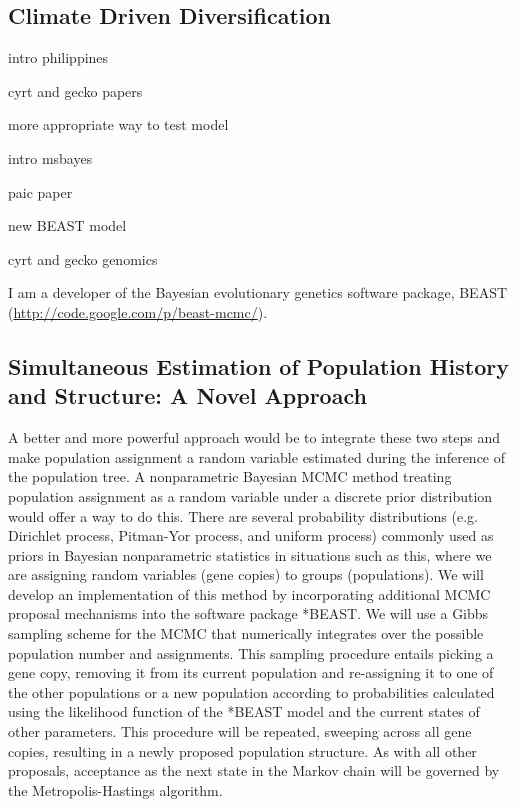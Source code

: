 \documentclass[10pt]{article}
\begin{document}
\subsection*{Climate Driven Diversification}
intro philippines

cyrt and gecko papers

more appropriate way to test model

intro msbayes

paic paper

new BEAST model

cyrt and gecko genomics

I am a developer of the Bayesian evolutionary genetics software package, BEAST (\url{http://code.google.com/p/beast-mcmc/}).

\subsection*{Simultaneous Estimation of Population History and Structure: A Novel Approach}
A better and more powerful approach would be to integrate these two steps and make population assignment a random variable estimated during the inference of the population tree.
A nonparametric Bayesian MCMC method treating population assignment as a random variable under a discrete prior distribution would offer a way to do this.
There are several probability distributions (e.g. Dirichlet process, Pitman-Yor process, and uniform process) commonly used as priors in Bayesian nonparametric statistics in situations such as this, where we are assigning random variables (gene copies) to groups (populations).
We will develop an implementation of this method by incorporating additional MCMC proposal mechanisms into the software package *BEAST.
We will use a Gibbs sampling scheme for the MCMC that numerically integrates over the possible population number and assignments.
This sampling procedure entails picking a gene copy, removing it from its current population and re-assigning it to one of the other populations or a new population according to probabilities calculated using the likelihood function of the *BEAST model and the current states of other parameters.
This procedure will be repeated, sweeping across all gene copies, resulting in a newly proposed population structure.
As with all other proposals, acceptance as the next state in the Markov chain will be governed by the Metropolis-Hastings algorithm.
\end{document}
